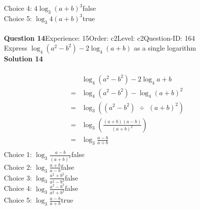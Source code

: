 \documentclass{article}
\begin{document}
Choice 4: \hspace{20pt}$4\log_{3}(a+b)^3$\hspace{20pt}false\\
Choice 5: \hspace{20pt}$\log_{3}4(a+b)^3$\hspace{20pt}true\\
\\[4pt]
\noindent\textbf{Question 14}\hspace{20pt}Experience: 15\hspace{20pt}Order: c2\hspace{20pt}Level: c2\hspace{20pt}Question-ID: 164\\[2pt]
Express $\log_{4}(a^2-b^2)-2\log_{4}(a+b)$ as a single logarithm\\[4pt]
\noindent\textbf{Solution 14}\\[2pt]
\\[-35pt]\begin{align*}
&\log_{4}(a^2-b^2)-2\log_{4}a+b\\[2pt]
=&\log_{4}(a^2-b^2)-\log_{4}(a+b)^2\\[2pt]
=&\log_{3}((a^2-b^2) \,\, \div \,\, (a+b)^2)\\[2pt]
=&\log_{3}\left(\displaystyle\frac{(a+b)(a-b)}{(a+b)^2}\right)\\[2pt]
=&\log_{3}\displaystyle\frac{a-b}{a+b}\\[-130pt]
\end{align*}
Choice 1: \hspace{20pt}$\log_{3}\displaystyle\frac{a-b}{(a+b)^2}$\hspace{20pt}false\\
Choice 2: \hspace{20pt}$\log_{3}\displaystyle\frac{a+b}{a-b}$\hspace{20pt}false\\
Choice 3: \hspace{20pt}$\log_{3}\displaystyle\frac{a^2+b^2}{a^2-b^2}$\hspace{20pt}false\\
Choice 4: \hspace{20pt}$\log_{3}\displaystyle\frac{a^2-b^2}{a^2+b^2}$\hspace{20pt}false\\
Choice 5: \hspace{20pt}$\log_{3}\displaystyle\frac{a-b}{a+b}$\hspace{20pt}true\\
\\[4pt]
\end{document}
